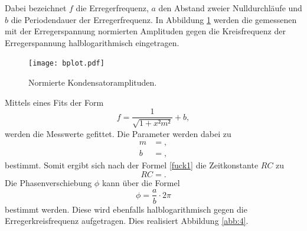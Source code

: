 %
%    
%
Dabei bezeichnet $f$ die Erregerfrequenz, $a$ den Abstand zweier Nulldurchläufe und $b$ die Periodendauer der Erregerfrequenz.
In Abbildung \ref{abb:3} werden die gemessenen mit der Erregerspannung normierten Amplituden gegen die Kreisfrequenz der Erregerspannung halblogarithmisch eingetragen.

\begin{figure}[H]
  \centering
  \texttt{[image: bplot.pdf]}
  \caption{Normierte Kondensatoramplituden.}
  \label{abb:3}
\end{figure}

Mittels eines Fits der Form
\begin{equation}
  f = \frac{1}{\sqrt{1+x²m²}} +b,
\end{equation}
werden die Messwerte gefittet.
Die Parameter werden dabei zu
\begin{align*}
  m &= , \\
  b &= ,
\end{align*}
bestimmt.
Somit ergibt sich nach der Formel \eqref{fuck1} die Zeitkonstante $RC$ zu
\begin{equation}
  RC = .
\end{equation}
Die Phasenverschiebung $\phi$ kann über die Formel
\begin{equation}
  \phi = \frac{a}{b} \cdot 2\pi
\end{equation}
bestimmt werden.
Diese wird ebenfalls halblogarithmisch gegen die Erregerkreisfrequenz aufgetragen.
Dies realisiert Abbildung \ref{abb:4}.

